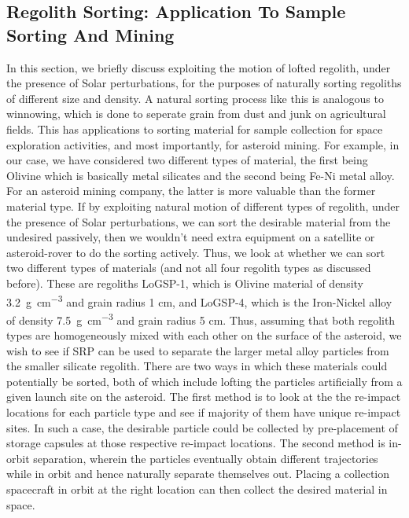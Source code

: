 \FloatBarrier

\subsection{Regolith Sorting: Application To Sample Sorting And Mining}
\label{sec:asteroid_mining}
In this section, we briefly discuss exploiting the motion of lofted regolith, under the presence of Solar perturbations, for the purposes of naturally sorting regoliths of different size and density. A natural sorting process like this is analogous to winnowing, which is done to seperate grain from dust and junk on agricultural fields. This has applications to sorting material for sample collection for space exploration activities, and most importantly, for asteroid mining. For example, in our case, we have considered two different types of material, the first being Olivine which is basically metal silicates and the second being Fe-Ni metal alloy. For an asteroid mining company, the latter is more valuable than the former material type. If by exploiting natural motion of different types of regolith, under the presence of Solar perturbations, we can sort the desirable material from the undesired passively, then we wouldn't need extra equipment on a satellite or asteroid-rover to do the sorting actively.
%
\newline\newline
%
Thus, we look at whether we can sort two different types of materials (and not all four regolith types as discussed before). These are regoliths LoGSP-1, which is Olivine material of density \SI{3.2}{\gram\per\centi\metre\cubed} and grain radius 1 cm, and LoGSP-4, which is the Iron-Nickel alloy of density \SI{7.5}{\gram\per\centi\metre\cubed} and grain radius 5 cm. Thus, assuming that both regolith types are homogeneously mixed with each other on the surface of the asteroid, we wish to see if \gls{SRP} can be used to separate the larger metal alloy particles from the smaller silicate regolith. There are two ways in which these materials could potentially be sorted, both of which include lofting the particles artificially from a given launch site on the asteroid. The first method is to look at the the re-impact locations for each particle type and see if majority of them have unique re-impact sites. In such a case, the desirable particle could be collected by pre-placement of storage capsules at those respective re-impact locations. The second method is in-orbit separation, wherein the particles eventually obtain different trajectories while in orbit and hence naturally separate themselves out. Placing a collection spacecraft in orbit at the right location can then collect the desired material in space.
